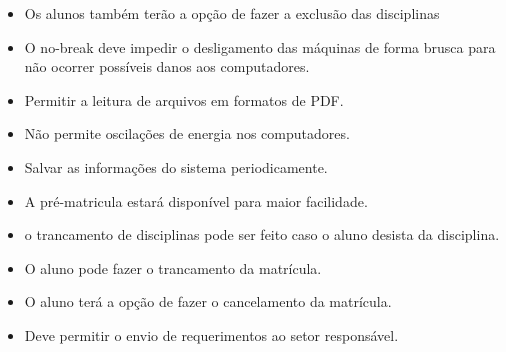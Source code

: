 \begin{itemize}
\item Os alunos também terão a opção de fazer a exclusão das disciplinas
\item O no-break deve impedir o desligamento das máquinas de forma brusca para não ocorrer possíveis danos aos computadores.
\item Permitir a leitura de arquivos em formatos de PDF.
\item Não permite oscilações de energia nos computadores.
\item Salvar as informações do sistema periodicamente.
\item A pré-matricula estará disponível para maior facilidade.
\item o trancamento de disciplinas pode ser feito caso o aluno desista da disciplina.
\item O aluno pode fazer o trancamento da matrícula.
\item O aluno terá a opção de fazer o cancelamento da matrícula.
\item Deve permitir o envio de requerimentos ao setor responsável.
  \end{itemize}
   
